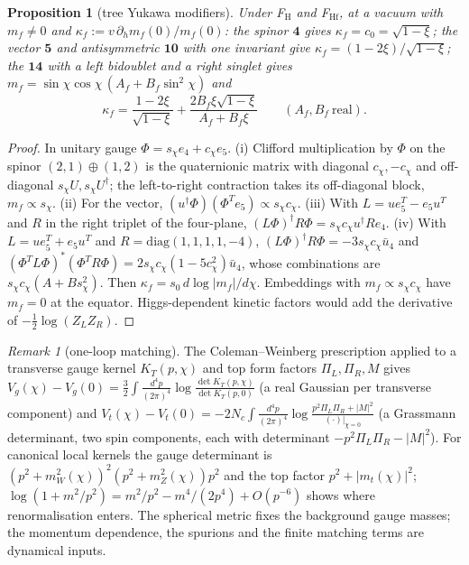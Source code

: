 \documentclass[aps,pra,onecolumn,superscriptaddress,nofootinbib,10pt]{revtex4-2}
\newtheorem{proposition}[theorem]{Proposition}
\theoremstyle{definition}
\theoremstyle{remark}
\newtheorem{remark}[theorem]{Remark}
\begin{document}
\begin{proposition}[tree Yukawa modifiers]\label{prop:hbyuk}
Under F$_{\mathrm H}$ and F$_{\mathrm{Hf}}$, at a vacuum with $m_f\ne0$ and $\kappa_f:=v\,\partial_hm_f(0)/m_f(0)$: the spinor $\mathbf4$ gives $\kappa_f=c_0=\sqrt{1-\xi}$; the
vector $\mathbf5$ and antisymmetric $\mathbf{10}$ with one invariant give $\kappa_f=(1-2\xi)/\sqrt{1-\xi}$; the $\mathbf{14}$ with a left bidoublet and a
right singlet gives $m_f=\sin\chi\cos\chi\,(A_f+B_f\sin^2\chi)$ and
\begin{equation}\label{eq:hbyuk14}
\kappa_f=\frac{1-2\xi}{\sqrt{1-\xi}}+\frac{2B_f\xi\sqrt{1-\xi}}{A_f+B_f\xi}\qquad(A_f,B_f\ \text{real}).
\end{equation}
\end{proposition}
\begin{proof}
In unitary gauge $\Phi=s_\chi e_4+c_\chi e_5$.  (i) Clifford multiplication by $\Phi$ on the spinor $(2,1)\oplus(1,2)$ is the
quaternionic matrix with diagonal $c_\chi,-c_\chi$ and off-diagonal $s_\chi U,s_\chi U^\dagger$; the left-to-right contraction takes
its off-diagonal block, $m_f\propto s_\chi$.  (ii) For the vector, $(u^\dagger\Phi)(\Phi^Te_5)\propto s_\chi c_\chi$.  (iii) With $L=ue_5^T-e_5u^T$ and $R$
in the right triplet of the four-plane, $(L\Phi)^\dagger R\Phi=s_\chi c_\chi u^\dagger Re_4$.  (iv) With $L=ue_5^T+e_5u^T$ and $R=\mathrm{diag}(1,1,1,1,-4)$,
$(L\Phi)^\dagger R\Phi=-3s_\chi c_\chi\bar u_4$ and $(\Phi^TL\Phi)^*(\Phi^TR\Phi)=2s_\chi c_\chi(1-5c_\chi^2)\bar u_4$, whose combinations are $s_\chi c_\chi(A+Bs_\chi^2)$.
Then $\kappa_f=s_0\,d\log\lvert m_f\rvert/d\chi$.  Embeddings with $m_f\propto s_\chi c_\chi$ have $m_f=0$ at the equator.  Higgs-dependent
kinetic factors would add the derivative of $-\tfrac12\log(Z_LZ_R)$.
\end{proof}

\begin{remark}[one-loop matching]\label{rem:hbloops}
The Coleman--Weinberg prescription \cite{n7:CW,n7:ACP,n7:PW} applied to a transverse gauge kernel $K_T(p,\chi)$ and top
form factors $\Pi_L,\Pi_R,M$ gives $V_g(\chi)-V_g(0)=\tfrac32\int\frac{d^4p}{(2\pi)^4}\log\frac{\det K_T(p,\chi)}{\det K_T(p,0)}$ (a real Gaussian per transverse
component) and $V_t(\chi)-V_t(0)=-2N_c\int\frac{d^4p}{(2\pi)^4}\log\frac{p^2\Pi_L\Pi_R+\lvert M\rvert^2}{(\cdot)|_{\chi=0}}$ (a Grassmann determinant, two spin components,
each with determinant $-p^2\Pi_L\Pi_R-\lvert M\rvert^2$).  For canonical local kernels the gauge determinant is
$(p^2+m_W^2(\chi))^2(p^2+m_Z^2(\chi))p^2$ and the top factor $p^2+\lvert m_t(\chi)\rvert^2$; $\log(1+m^2/p^2)=m^2/p^2-m^4/(2p^4)+O(p^{-6})$ shows where
renormalisation enters.  The spherical metric fixes the background gauge masses; the momentum
dependence, the spurions and the finite matching terms are dynamical inputs.
\end{remark}
\end{document}
